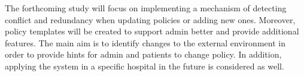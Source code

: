 The forthcoming study will focus on implementing a mechanism of detecting conflict and redundancy when updating policies or adding new ones. 
Moreover,  policy templates will be created to support admin better and provide additional features. 
The main aim is to identify changes to the external environment in order to provide hints for admin and patients to change policy. 
In addition, applying the system in a specific hospital in the future is considered as well.
